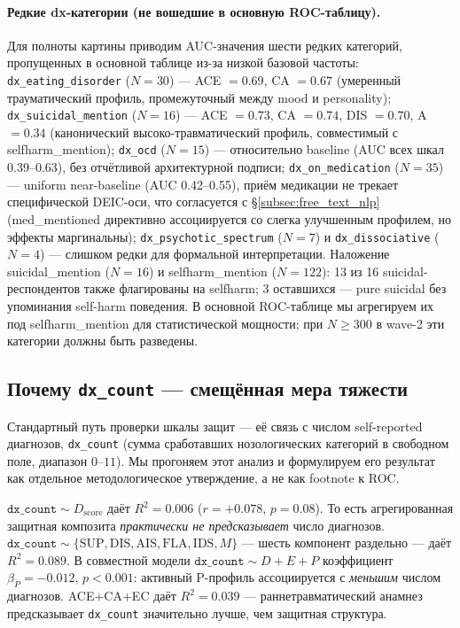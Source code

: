 \paragraph{Редкие dx-категории (не вошедшие в основную ROC-таблицу).} Для полноты картины приводим AUC-значения шести редких категорий, пропущенных в основной таблице из-за низкой базовой частоты: \texttt{dx\_eating\_disorder} ($N = 30$) --- ACE $= 0.69$, CA $= 0.67$ (умеренный трауматический профиль, промежуточный между mood и personality); \texttt{dx\_suicidal\_mention} ($N = 16$) --- ACE $= 0.73$, CA $= 0.74$, DIS $= 0.70$, A $= 0.34$ (канонический высоко-травматический профиль, совместимый с selfharm\_mention); \texttt{dx\_ocd} ($N = 15$) --- относительно baseline (AUC всех шкал 0.39--0.63), без отчётливой архитектурной подписи; \texttt{dx\_on\_medication} ($N = 35$) --- uniform near-baseline (AUC 0.42--0.55), приём медикации не трекает специфической DEIC-оси, что согласуется с §\ref{subsec:free_text_nlp} (med\_mentioned директивно ассоциируется со слегка улучшенным профилем, но эффекты маргинальны); \texttt{dx\_psychotic\_spectrum} ($N = 7$) и \texttt{dx\_dissociative} ($N = 4$) --- слишком редки для формальной интерпретации. Наложение suicidal\_mention ($N = 16$) и selfharm\_mention ($N = 122$): 13 из 16 suicidal-респондентов также флагированы на selfharm; 3 оставшихся --- pure suicidal без упоминания self-harm поведения. В основной ROC-таблице мы агрегируем их под selfharm\_mention для статистической мощности; при $N \geq 300$ в wave-2 эти категории должны быть разведены.

\subsection{\texorpdfstring{Почему \texttt{dx\_count} --- смещённая мера тяжести}{Почему dx_count --- смещённая мера тяжести}}
\label{subsec:dx_count_bias}

Стандартный путь проверки шкалы защит --- её связь с числом self-reported диагнозов, \texttt{dx\_count} (сумма сработавших нозологических категорий в свободном поле, диапазон $0$--$11$). Мы прогоняем этот анализ и формулируем его результат как отдельное методологическое утверждение, а не как footnote к ROC.

$\texttt{dx\_count} \sim D_{\mathrm{score}}$ даёт $R^2 = 0.006$ ($r = +0.078$, $p = 0.08$). То есть агрегированная защитная композита \emph{практически не предсказывает} число диагнозов. $\texttt{dx\_count} \sim \{\mathrm{SUP}, \mathrm{DIS}, \mathrm{AIS}, \mathrm{FLA}, \mathrm{IDS}, M\}$ --- шесть компонент раздельно --- даёт $R^2 = 0.089$. В совместной модели $\texttt{dx\_count} \sim D + E + P$ коэффициент $\beta_P = -0.012$, $p < 0.001$: активный P-профиль ассоциируется с \emph{меньшим} числом диагнозов. ACE$+$CA$+$EC даёт $R^2 = 0.039$ --- раннетравматический анамнез предсказывает \texttt{dx\_count} значительно лучше, чем защитная структура.

